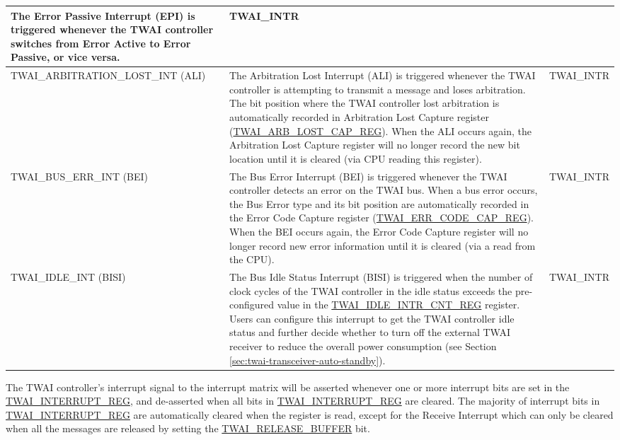 \documentclass[main\_\_EN.tex]{subfiles}
\begin{document}
\begin{longtable}{ | L{5cm} | L{7cm} | L{3.5cm} | }
The Error Passive Interrupt (EPI) is triggered whenever the TWAI controller switches from Error Active to Error Passive, or vice versa.
& TWAI\_INTR \\ \hline
\label{int:TWAIARBITRATIONLOSTINT}TWAI\_ARBITRATION\_LOST\_INT (ALI) &
The Arbitration Lost Interrupt (ALI) is triggered whenever the TWAI controller is attempting to transmit a message and loses arbitration. The bit position where the TWAI controller lost arbitration is automatically recorded in Arbitration Lost Capture register (\hyperref[regdesc:TWAIARBLOSTCAPREG]{TWAI\_ARB\_LOST\_CAP\_REG}). When the ALI occurs again, the Arbitration Lost Capture register will no longer record the new bit location until it is cleared (via CPU reading this register).
& TWAI\_INTR \\ \hline
\label{int:TWAIBUSERRINT}TWAI\_BUS\_ERR\_INT (BEI) &
The Bus Error Interrupt (BEI) is triggered whenever the TWAI controller detects an error on the TWAI bus. When a bus error occurs, the Bus Error type and its bit position are automatically recorded in the Error Code Capture register (\hyperref[regdesc:TWAIERRCODECAPREG]{TWAI\_ERR\_CODE\_CAP\_REG}). When the BEI occurs again, the Error Code Capture register will no longer record new error information until it is cleared (via a read from the CPU).
& TWAI\_INTR \\ \hline
\label{int:TWAIIDLEINT}TWAI\_IDLE\_INT (BISI) &
The Bus Idle Status Interrupt (BISI) is triggered when the number of clock cycles of the TWAI controller in the idle status exceeds the pre-configured value in the \hyperref[regdesc:TWAIIDLEINTRCNTREG]{TWAI\_IDLE\_INTR\_CNT\_REG} register. Users can configure this interrupt to get the TWAI controller idle status and further decide whether to turn off the external TWAI receiver to reduce the overall power consumption (see Section \ref{sec:twai-transceiver-auto-standby}).
& TWAI\_INTR \\ \hline
\end{longtable}

The TWAI controller's interrupt signal to the interrupt matrix will be asserted whenever one or more interrupt bits are set in the \hyperref[regdesc:TWAIINTERRUPTREG]{TWAI\_INTERRUPT\_REG}, and de-asserted when all bits in \hyperref[regdesc:TWAIINTERRUPTREG]{TWAI\_INTERRUPT\_REG} are cleared. The majority of interrupt bits in \hyperref[regdesc:TWAIINTERRUPTREG]{TWAI\_INTERRUPT\_REG} are automatically cleared when the register is read, except for the Receive Interrupt which can only be cleared when all the messages are released by setting the \hyperref[fielddesc:TWAIRELEASEBUFFER]{TWAI\_RELEASE\_BUFFER} bit.
\end{document}
